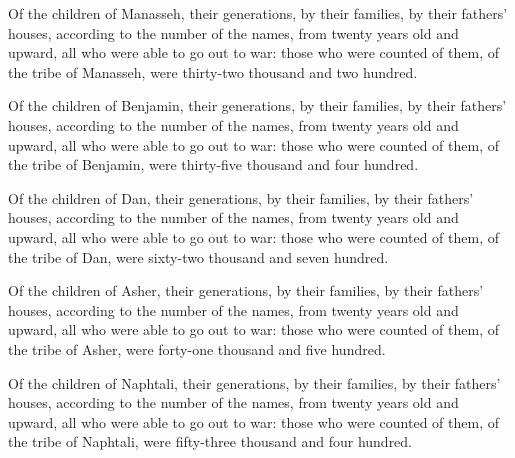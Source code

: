  Of the children of Manasseh, their generations, by their
families, by their fathers' houses, according to the number of the
names, from twenty years old and upward, all who were able to go out to
war:  those who were counted of them, of the tribe of
Manasseh, were thirty-two thousand and two hundred.

 Of the children of Benjamin, their generations, by their
families, by their fathers' houses, according to the number of the
names, from twenty years old and upward, all who were able to go out to
war:  those who were counted of them, of the tribe of
Benjamin, were thirty-five thousand and four hundred.

 Of the children of Dan, their generations, by their
families, by their fathers' houses, according to the number of the
names, from twenty years old and upward, all who were able to go out to
war:  those who were counted of them, of the tribe of
Dan, were sixty-two thousand and seven hundred.

 Of the children of Asher, their generations, by their
families, by their fathers' houses, according to the number of the
names, from twenty years old and upward, all who were able to go out to
war:  those who were counted of them, of the tribe of
Asher, were forty-one thousand and five hundred.

 Of the children of Naphtali, their generations, by their
families, by their fathers' houses, according to the number of the
names, from twenty years old and upward, all who were able to go out to
war:  those who were counted of them, of the tribe of
Naphtali, were fifty-three thousand and four hundred.

